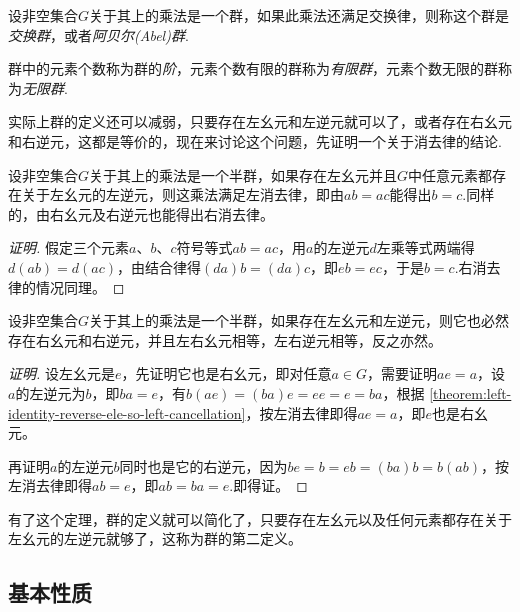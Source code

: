 \begin{definition}
  设非空集合$G$关于其上的乘法是一个群，如果此乘法还满足交换律，则称这个群是\emph{交换群}，或者\emph{阿贝尔(Abel)群}.
\end{definition}

\begin{definition}
  群中的元素个数称为群的\emph{阶}，元素个数有限的群称为\emph{有限群}，元素个数无限的群称为\emph{无限群}.
\end{definition}

实际上群的定义还可以减弱，只要存在左幺元和左逆元就可以了，或者存在右幺元和右逆元，这都是等价的，现在来讨论这个问题，先证明一个关于消去律的结论.

\begin{theorem}
  \label{theorem:left-identity-reverse-ele-so-left-cancellation}
  设非空集合$G$关于其上的乘法是一个半群，如果存在左幺元并且$G$中任意元素都存在关于左幺元的左逆元，则这乘法满足左消去律，即由$ab=ac$能得出$b=c$.同样的，由右幺元及右逆元也能得出右消去律。
\end{theorem}

\begin{proof}[证明]
  假定三个元素$a$、$b$、$c$符号等式$ab=ac$，用$a$的左逆元$d$左乘等式两端得$d(ab)=d(ac)$，由结合律得$(da)b=(da)c$，即$eb=ec$，于是$b=c$.右消去律的情况同理。
\end{proof}

\begin{theorem}
  设非空集合$G$关于其上的乘法是一个半群，如果存在左幺元和左逆元，则它也必然存在右幺元和右逆元，并且左右幺元相等，左右逆元相等，反之亦然。
\end{theorem}

\begin{proof}[证明]
  设左幺元是$e$，先证明它也是右幺元，即对任意$a \in G$，需要证明$ae=a$，设$a$的左逆元为$b$，即$ba=e$，有$b(ae)=(ba)e=ee=e=ba$，根据 \autoref{theorem:left-identity-reverse-ele-so-left-cancellation}，按左消去律即得$ae=a$，即$e$也是右幺元。

  再证明$a$的左逆元$b$同时也是它的右逆元，因为$be=b=eb=(ba)b=b(ab)$，按左消去律即得$ab=e$，即$ab=ba=e$.即得证。
\end{proof}

有了这个定理，群的定义就可以简化了，只要存在左幺元以及任何元素都存在关于左幺元的左逆元就够了，这称为群的第二定义。

\subsection{基本性质}
\label{sec:basic-properties-of-group}

